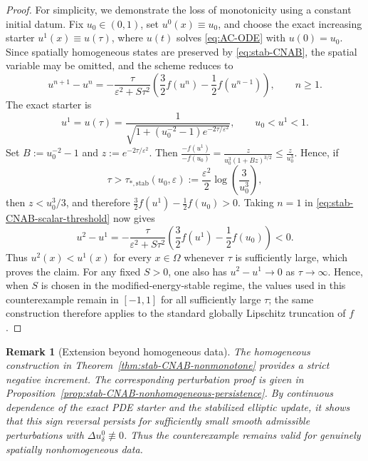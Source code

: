 \documentclass[final, 3p, times]{elsarticle}%
\newcommand{\eps}{\varepsilon}
\newtheorem{remark}[theorem]{Remark}
\begin{document}
\begin{proof}
For simplicity, we demonstrate the loss of monotonicity using a constant
initial datum. Fix \(u_0\in(0,1)\), set \(u^0(x)\equiv u_0\), and choose
the exact increasing starter \(u^1(x)\equiv u(\tau)\), where \(u(t)\)
solves \eqref{eq:AC-ODE} with \(u(0)=u_0\). Since spatially homogeneous
states are preserved by \eqref{eq:stab-CNAB}, the spatial variable may be
omitted, and the scheme reduces to
\begin{equation}
    u^{n+1}-u^n
    =-\frac{\tau}{\eps^2+S\tau^2}
    \left(\frac32 f(u^n)-\frac12 f(u^{n-1})\right),
    \qquad n\ge1.
    \label{eq:stab-CNAB-scalar-threshold}
\end{equation}
The exact starter is
\begin{equation}
    u^1=u(\tau)
    =\frac1{\sqrt{1+(u_0^{-2}-1)e^{-2\tau/\eps^2}}},
    \qquad u_0<u^1<1.
    \label{eq:stab-CNAB-exact-start-formula}
\end{equation}
Set \(B:=u_0^{-2}-1\) and \(z:=e^{-2\tau/\eps^2}\). Then
$
    \frac{-f(u^1)}{-f(u_0)}
    =\frac{z}{u_0^3(1+Bz)^{3/2}}
    \le\frac{z}{u_0^3}.
$
Hence, if
\begin{equation}
    \tau>\tau_{*,\mathrm{stab}}(u_0,\eps)
    :=\frac{\eps^2}{2}\log\left(\frac{3}{u_0^3}\right),
    \label{eq:stab-CNAB-explicit-threshold}
\end{equation}
then \(z<u_0^3/3\), and therefore
$
    \frac32 f(u^1)-\frac12 f(u_0)>0.
$
Taking \(n=1\) in \eqref{eq:stab-CNAB-scalar-threshold} now gives
\[
    u^2-u^1
    =-\frac{\tau}{\eps^2+S\tau^2}
    \left(\frac32 f(u^1)-\frac12 f(u_0)\right)<0.
\]
Thus \(u^2(x)<u^1(x)\) for every \(x\in\Omega\) whenever \(\tau\) is
sufficiently large, which proves the claim.
For any fixed \(S>0\), one also has \(u^2-u^1\to0\) as
\(\tau\to\infty\). Hence, when \(S\) is chosen in the modified-energy-stable
regime, the values used in this counterexample remain in \([-1,1]\) for all
sufficiently large \(\tau\); the same construction therefore applies to the
standard globally Lipschitz truncation of \(f\).
\end{proof}
\begin{remark}[Extension beyond homogeneous data]
The homogeneous construction in Theorem~\ref{thm:stab-CNAB-nonmonotone}
provides a strict negative increment. The corresponding perturbation proof
is given in Proposition~\ref{prop:stab-CNAB-nonhomogeneous-persistence}. By continuous
dependence of the exact PDE starter and the stabilized elliptic update, it
shows that
this sign reversal persists for sufficiently small smooth admissible
perturbations with \(\Delta u^0_\delta\not\equiv0\). Thus the counterexample
remains valid for genuinely spatially nonhomogeneous data.
\end{remark}
\end{document}
